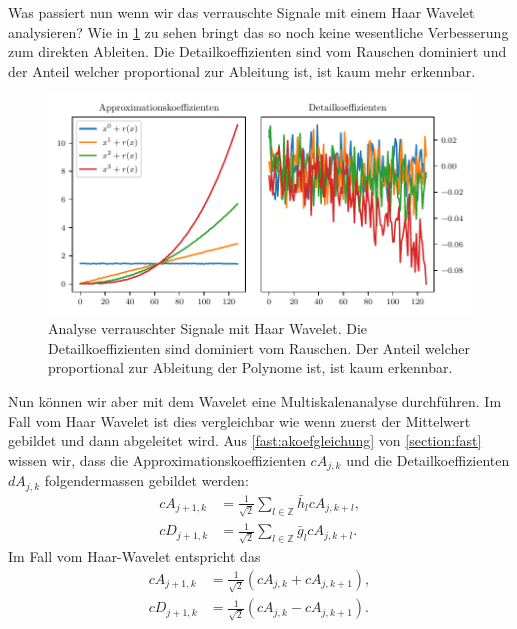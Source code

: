 \begin{refsection}
Was passiert nun wenn wir das verrauschte Signale mit einem Haar Wavelet
analysieren?  Wie in \cref{polynomials:noise:db1} zu sehen bringt das so noch
keine wesentliche Verbesserung zum direkten Ableiten. Die Detailkoeffizienten
sind vom Rauschen dominiert und der Anteil welcher proportional zur Ableitung
ist, ist kaum mehr erkennbar.

\begin{figure}
    \centering
    \includegraphics{papers/polynomials/images/polynomials_noise_db1.pdf}
    \caption{Analyse verrauschter Signale mit Haar Wavelet. Die
             Detailkoeffizienten sind dominiert vom Rauschen. Der Anteil
             welcher proportional zur Ableitung der Polynome ist, ist kaum
             erkennbar.\label{polynomials:noise:db1}}
\end{figure}

Nun können wir aber mit dem Wavelet eine Multiskalenanalyse durchführen. Im
Fall vom Haar Wavelet ist dies vergleichbar wie wenn zuerst der Mittelwert
gebildet und dann abgeleitet wird. Aus \cref{fast:akoefgleichung} von
\cref{section:fast} wissen wir, dass die Approximationskoeffizienten $cA_{j,k}$
und die Detailkoeffizienten $dA_{j,k}$ folgendermassen gebildet werden:
\begin{align}
cA_{j+1,k}
&=
\frac{1}{\sqrt{2}} \sum_{l\in\mathbb Z} \bar{h}_l cA_{j,k+l},
\nonumber \\
cD_{j+1,k}
&=
\frac{1}{\sqrt{2}} \sum_{l\in\mathbb Z} \bar{g}_l cA_{j,k+l}.
\end{align}
Im Fall vom Haar-Wavelet entspricht das
\begin{align}
cA_{j+1,k}
&=
\frac{1}{\sqrt{2}} (cA_{j,k} + cA_{j,k+1}),
\nonumber \\
cD_{j+1,k}
&=
\frac{1}{\sqrt{2}} (cA_{j,k} - cA_{j,k+1}).
\end{align}


\end{refsection}
